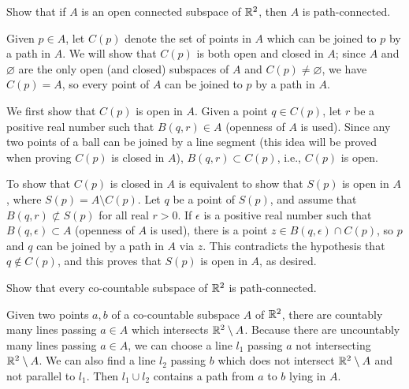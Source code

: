\begin{prob}
    Show that if $A$ is an open connected subspace of ${\mathbb{R}}^2$, then $A$ is path-connected.
\end{prob}
\begin{sol}
    Given $p\in A$, let $C(p)$ denote the set of points in $A$ which can be joined to $p$ by a path in $A$.
    We will show that $C(p)$ is both open and closed in $A$; since $A$ and $\varnothing$ are the only open (and closed) subspaces of $A$ and $C(p)\neq\varnothing$, we have $C(p)=A$, so every point of $A$ can be joined to $p$ by a path in $A$.

    We first show that $C(p)$ is open in $A$.
    Given a point $q\in C(p)$, let $r$ be a positive real number such that $B(q, r)\in A$ (openness of $A$ is used).
    Since any two points of a ball can be joined by a line segment (this idea will be proved when proving $C(p)$ is closed in $A$), $B(q, r)\subset C(p)$, i.e., $C(p)$ is open.

    To show that $C(p)$ is closed in $A$ is equivalent to show that $S(p)$ is open in $A$, where $S(p)=A\setminus C(p)$.
    Let $q$ be a point of $S(p)$, and assume that $B(q, r)\not\subset S(p)$ for all real $r>0$.
    If $\epsilon$ is a positive real number such that $B(q, \epsilon)\subset A$ (openness of $A$ is used), there is a point $z\in B(q, \epsilon)\cap C(p)$, so $p$ and $q$ can be joined by a path in $A$ via $z$.
    This contradicts the hypothesis that $q\notin C(p)$, and this proves that $S(p)$ is open in $A$, as desired.
\end{sol}

\begin{prob}
    Show that every co-countable subspace of ${\mathbb{R}}^2$ is path-connected.
\end{prob}
\begin{sol}
    Given two points $a, b$ of a co-countable subspace $A$ of ${\mathbb{R}}^2$, there are countably many lines passing $a\in A$ which intersects ${\mathbb{R}}^2\setminus A$.
    Because there are uncountably many lines passing $a\in A$, we can choose a line $l_1$ passing $a$ not intersecting ${\mathbb{R}}^2\setminus A$.
    We can also find a line $l_2$ passing $b$ which does not intersect ${\mathbb{R}}^2\setminus A$ and not parallel to $l_1$.
    Then $l_1\cup l_2$ contains a path from $a$ to $b$ lying in $A$.
\end{sol}
